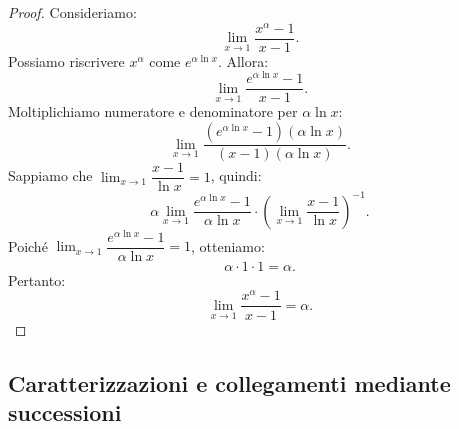 \documentclass{article}
\theoremstyle{plain}
\theoremstyle{definition}
\theoremstyle{remark}
\begin{document}
\begin{enumerate}
\begin{proof}
        Consideriamo:
        \[
        \lim_{x \to 1}\dfrac{x^\alpha - 1}{x - 1}.
        \]
        Possiamo riscrivere \( x^\alpha \) come \( e^{\alpha \ln x} \). Allora:
        \[
        \lim_{x \to 1}\dfrac{e^{\alpha \ln x} - 1}{x - 1}.
        \]
        Moltiplichiamo numeratore e denominatore per \( \alpha \ln x \):
        \[
        \lim_{x \to 1}\dfrac{(e^{\alpha \ln x} - 1)(\alpha \ln x)}{(x - 1)(\alpha \ln x)}.
        \]
        Sappiamo che \( \lim_{x \to 1} \dfrac{x - 1}{\ln x} = 1 \), quindi:
        \[
        \alpha \lim_{x \to 1}\dfrac{e^{\alpha \ln x} - 1}{\alpha \ln x} \cdot \left( \lim_{x \to 1} \dfrac{x - 1}{\ln x} \right)^{-1}.
        \]
        Poiché \( \lim_{x \to 1} \dfrac{e^{\alpha \ln x} - 1}{\alpha \ln x} = 1 \), otteniamo:
        \[
        \alpha \cdot 1 \cdot 1 = \alpha.
        \]
        Pertanto:
        \[
        \lim_{x \to 1}\dfrac{x^\alpha - 1}{x - 1} = \alpha.
        \]
    \end{proof}
\end{enumerate}

\vspace{10pt}

\subsection{Caratterizzazioni e collegamenti mediante successioni}

\vspace{10pt}
\end{document}
